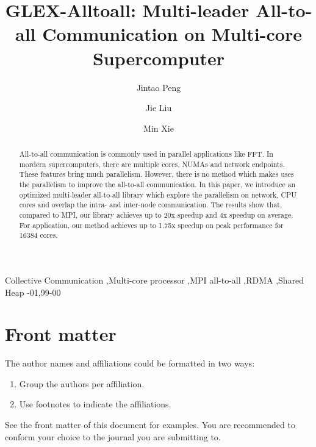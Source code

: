 \documentclass[5p,times]{elsarticle}
\begin{document}
\begin{frontmatter}

\title{GLEX-Alltoall: Multi-leader All-to-all Communication on Multi-core Supercomputer}

\author{Jintao Peng}
\author{Jie Liu}
\author{Min Xie}

\address{Changsha, China}



\begin{abstract}
		All-to-all communication is commonly used in parallel applications like FFT. In mordern supercomputers, there are multiple cores, NUMAs and network endpoints. These features bring much parallelism. However, there is no method which makes uses the parallelism to improve the all-to-all communication. In this paper, we introduce an optimized multi-leader all-to-all library which explore the parallelism on network, CPU cores and overlap the intra- and inter-node communication. The results show that, compared to MPI, our library achieves up to 20x speedup and 4x speedup on average. For application, our method achieves up to 1.75x speedup on peak performance for 16384 cores.
\end{abstract}

\begin{keyword}
 Collective Communication \sep Multi-core processor \sep MPI all-to-all \sep RDMA \sep Shared Heap
-01\sep  99-00
\end{keyword}

\end{frontmatter}

\linenumbers




\section{Front matter}

The author names and affiliations could be formatted in two ways:
\begin{enumerate}[(1)]
\item Group the authors per affiliation.
\item Use footnotes to indicate the affiliations.
\end{enumerate}
See the front matter of this document for examples. You are recommended to conform your choice to the journal you are submitting to.
\end{document}
